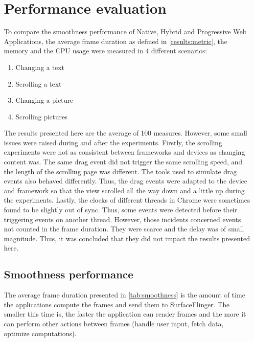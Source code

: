 \documentclass{kththesis}
\begin{document}
\section{Performance evaluation}
\label{results:performance}

To compare the smoothness performance of Native, Hybrid and Progressive Web Applications, the average frame duration as defined in \autoref{results:metric}, the memory and the CPU usage were measured in 4 different scenarios: 

\begin{enumerate} [ref={Scenario}\xspace\arabic*]
    \item \label{scenario:text:changing} Changing a text
    \item \label{scenario:text:scrolling} Scrolling a text
    \item \label{scenario:picture:changing} Changing a picture
    \item \label{scenario:picture:scrolling} Scrolling pictures
\end{enumerate}

The results presented here are the average of 100 measures. However, some small issues were raised during and after the experiments.\newline
Firstly, the scrolling experiments were not as consistent between frameworks and devices as changing content was. The same drag event did not trigger the same scrolling speed, and the length of the scrolling page was different. The tools used to simulate drag events also behaved  differently. Thus, the drag events were adapted to the device and framework so that the view scrolled all the way down and a little up during the experiments. \newline
Lastly, the clocks of different threads in Chrome were sometimes found to be slightly out of sync. Thus, some events were detected before their triggering events on another thread. However, those incidents concerned events not counted in the frame duration. They were scarce and the delay was of small magnitude. Thus, it was concluded that they did not impact the results presented here.

\subsection{Smoothness performance}

The average frame duration presented in \autoref{tab:smoothness} is the amount of time the applications compute the frames and send them to SurfaceFlinger. The smaller this time is, the faster the application can render frames and the more it can perform other actions between frames (handle user input, fetch data, optimize computations). 
\end{document}
